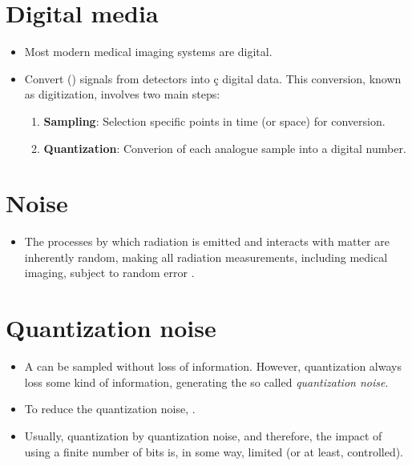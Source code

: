\section{Digital media}
\begin{itemize}
\item Most modern medical imaging systems are digital.
\item Convert  () signals from detectors into
ç  digital data. This conversion, known as digitization, involves two
  main steps:
  \begin{enumerate}
  \item \textbf{Sampling}: Selection specific points in time (or
    space) for conversion.
  \item \textbf{Quantization}: Converion of each analogue sample into a
    digital number.
  \end{enumerate}
\end{itemize}

\section{Noise}
\begin{itemize}
\item The processes by which radiation is emitted and interacts with
  matter are inherently random, making all radiation measurements,
  including medical imaging, subject to random error
  \cite{bushberg2011essential}.
\end{itemize}

\section{Quantization noise}
\begin{itemize}
\item A  can be sampled without
  loss of information. However, quantization always loss some kind of
  information, generating the so called \emph{quantization noise}.
\item To reduce the quantization noise,  \cite{bushberg2011essential}.
\item Usually, quantization  by quantization noise, and therefore,
  the impact of using a finite number of bits is, in some way, limited
  (or at least, controlled).
\end{itemize}
